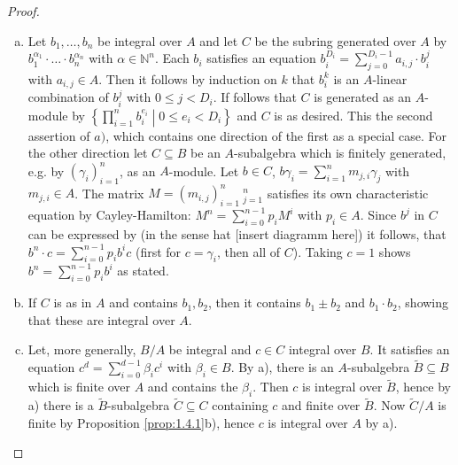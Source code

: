 \documentclass[DIV=14,parskip=half]{scrartcl}
\newenvironment{alphanumerate}{\begin{enumerate}[a)]}{\end{enumerate}}
\theoremstyle{definition}
\newcommand{\N}{\mathbb{N}}
\newcommand{\ldotspam}{,\ldots,}
\begin{document}
\begin{proof}
 \begin{alphanumerate}
  \item Let $b_1\ldotspam b_n$ be integral over $A$ and let $C$ be the subring generated over $A$ by $b_1^{\alpha_1}\cdot\ldots\cdot b_n^{\alpha_n}$ with $\alpha\in \N^n$. Each $b_i$ satisfies an equation $b_i^{D_i} = \sum_{j=0}^{D_i-1} a_{i,j}\cdot b_i^j$ with $a_{i,j}\in A$. Then it follows by induction on $k$ that $b_i^k$ is an $A$-linear combination of $b_i^j$ with $0\leq j < D_i$. If follows that $C$ is generated as an $A$-module by $\left\{\prod_{i=1}^n b_i^{e_i}\middle| 0\leq e_i< D_i\right\}$ and $C$ is as desired. This the second assertion of $a)$, which contains one direction of the first as a special case. For the other direction let $C\subseteq B$ be an $A$-subalgebra which is finitely generated, e.g. by $(\gamma_i)_{i=1}^n$, as an $A$-module. Let $b\in C$, $b\gamma_i=\sum_{i=1}^n m_{j,i} \gamma_j$ with $m_{j,i}\in A$. The matrix $M=(m_{i,j})_{i=1}^n\ _{j=1}^n$ satisfies its own characteristic equation by Cayley-Hamilton: $M^n = \sum_{i=0}^{n-1}p_i M^i$ with $p_i\in A$. Since $b^j$ in $C$ can be expressed by (in the sense hat [insert diagramm here]) it follows, that $b^n \cdot c = \sum_{i=0}^{n-1} p_ib^ic$ (first for $c=\gamma_i$, then all of $C$). Taking $c=1$ shows $b^n = \sum_{i=0}^{n-1}p_i b^i$ as stated.
  \item If $C$ is as in $A$ and contains $b_1, b_2$, then it contains $b_1\pm b_2$ and $b_1\cdot b_2$, showing that these are integral over $A$. 
  \item Let, more generally, $B/A$ be integral and $c\in C$ integral over $B$. It satisfies an equation $c^d = \sum_{i=0}^{d-1} \beta_i c^i$ with $\beta_i\in B$. By a), there is an $A$-subalgebra $\tilde B\subseteq B$ which is finite over $A$ and contains the $\beta_i$. Then $c$ is integral over $\tilde B$, hence by a) there is a $\tilde B$-subalgebra $\tilde C\subseteq C$ containing $c$ and finite over $\tilde B$. Now $\tilde C/A$ is finite by Proposition \ref{prop:1.4.1}b), hence $c$ is integral over $A$ by a).
 \end{alphanumerate}


\end{proof}
\end{document}
